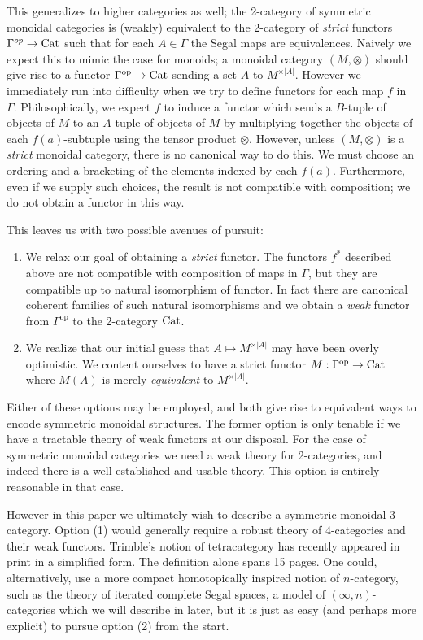 \documentclass{amsart}
\begin{document}
This generalizes to higher categories as well; the 2-category of symmetric monoidal categories is (weakly) equivalent to the 2-category of {\em strict} functors $\Gamma^{op} \to \mathrm{Cat}$ such that for each $A \in \Gamma$ the Segal maps are equivalences. Naively we expect this to mimic the case for monoids; a monoidal category $(M, \otimes)$ should give rise to a functor $\Gamma^\text{op} \to \mathrm{Cat}$ sending a set $A$ to $M^{\times |A|}$. However we immediately run into difficulty when we try to define functors for each map $f$ in $\Gamma$. Philosophically, we expect $f$ to induce a functor which sends a $B$-tuple of objects of $M$ to an $A$-tuple of objects of $M$ by multiplying together the objects of each $f(a)$-subtuple using the tensor product $\otimes$. However, unless $(M, \otimes)$ is a {\em strict} monoidal category, there is no canonical way to do this. We must choose an ordering and a bracketing of the elements indexed by each $f(a)$. Furthermore, even if we supply such choices, the result is not compatible with composition; we do not obtain a functor in this way. 

This leaves us with two possible avenues of pursuit:
\begin{enumerate}
	\item We relax our goal of obtaining a {\em strict} functor. The functors $f^*$ described above are not compatible with composition of maps in $\Gamma$, but they are compatible up to natural isomorphism of functor. In fact there are canonical coherent families of such natural isomorphisms and we obtain a {\em weak} functor from $\Gamma^\text{op}$ to the 2-category $\mathrm{Cat}$. 
	\item We realize that our initial guess that $A \mapsto M^{\times |A|}$ may have been overly optimistic. We content ourselves to have a strict functor $M: \Gamma^\text{op} \to \mathrm{Cat}$ where $M(A)$ is merely {\em equivalent} to  $M^{\times |A|}$. 
\end{enumerate}
Either of these options may be employed, and both give rise to equivalent ways to encode symmetric monoidal structures. The former option is only tenable if we have a tractable theory of weak functors at our disposal. For the case of symmetric monoidal categories we need a weak theory for 2-categories, and indeed there is a well established and usable theory. This option is entirely reasonable in that case. 

However in this paper we ultimately wish to describe a symmetric monoidal 3-category. Option (1) would generally require a robust theory of 4-categories and their weak functors. Trimble's notion of tetracategory has recently appeared in print \cite{1112.0560} in a simplified form. The definition alone spans 15 pages. One could, alternatively, use a more compact homotopically inspired notion of $n$-category, such as the theory of iterated complete Segal spaces, a model of $(\infty, n)$-categories which we will describe in later, but it is just as easy (and perhaps more explicit) to pursue option (2) from the start. 
\end{document}
